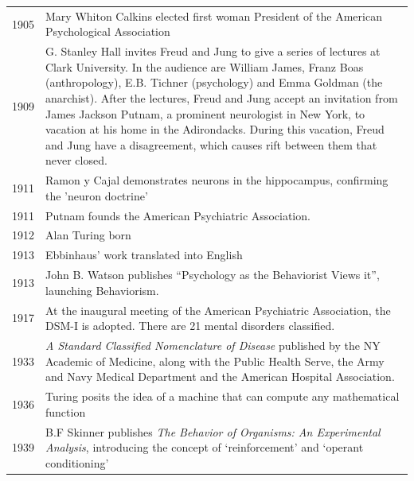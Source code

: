 \begin{refsection}
\begin{longtable}[!t]{ | P{2cm} | P{11.8cm} | }
1905&Mary Whiton Calkins elected first woman President of the American Psychological Association \\
1909&G. Stanley Hall invites Freud and Jung to give a series of lectures at Clark University.  In the audience are William James, Franz Boas (anthropology), E.B. Tichner (psychology) and Emma Goldman (the anarchist). After the lectures, Freud and Jung accept an invitation from James Jackson Putnam, a prominent neurologist in New York, to vacation at his home in the Adirondacks.  During this vacation, Freud and Jung have a disagreement, which causes rift between them that never closed.  \\
1911&Ramon y Cajal demonstrates neurons in the hippocampus, confirming the 'neuron doctrine' \\
1911&Putnam founds the American Psychiatric Association. \\
1912&Alan Turing born \\
1913&Ebbinhaus’ work translated into English \\
1913&John B. Watson publishes “Psychology as the Behaviorist Views it”, launching Behaviorism.   \\
1917&At the inaugural meeting of the American Psychiatric Association, the DSM-I is adopted.  There are 21 mental disorders classified.  \\
1933&\emph{A Standard Classified Nomenclature of Disease} published by the NY Academic of Medicine, along with the Public Health Serve, the Army and Navy Medical Department and the American Hospital Association.  \\
1936&Turing posits the idea of a machine that can compute any mathematical function \\
1939&B.F Skinner publishes \emph{The Behavior of Organisms: An Experimental Analysis}, introducing the concept of ‘reinforcement’ and ‘operant conditioning’  \\


\end{longtable}
\end{refsection}
